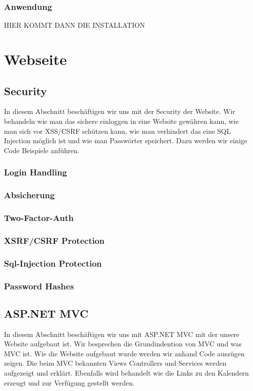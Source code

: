 \documentclass[12pt]{scrartcl}
\begin{document}
\subsubsection {Anwendung}
HIER KOMMT DANN DIE INSTALLATION

\section{Webseite}
\label{sec:Webseite}
\subsection{Security}
\label{sec:Security}
In diesem Abschnitt beschäftigen wir uns mit der Security der Website.
Wir behandeln wie man das sichere einloggen in eine Website gewähren kann, 
wie man sich vor XSS/CSRF schützen kann, wie man verhindert das eine SQL Injection
möglich ist und wie man Passwörter speichert. Dazu werden wir einige Code Beispiele anführen.

\subsubsection{Login Handling}
\label{sec:Login}
\subsubsection{Absicherung}
\label{sec:Absicherung}
\subsubsection{Two-Factor-Auth}
\label{sec:tfa}
\subsubsection{XSRF/CSRF Protection}
\label{sec:xss}
\subsubsection{Sql-Injection Protection}
\label{sec:sqli}
\subsubsection{Password Hashes}
\label{sec:hash}
\subsection{ASP.NET MVC}
In diesem Abschnitt beschäftigen wir uns mit ASP.NET MVC mit der unsere Website aufgebaut ist. Wir besprechen die Grundindention von MVC und was MVC ist. Wie die Website aufgebaut wurde werden wir anhand Code auszügen zeigen. Die beim MVC bekannten Views Controllers und Services werden aufgezeigt und erklärt. Ebenfalls wird behandelt wie die Links zu den Kalendern erzeugt und zur Verfügung gestellt werden. 
\label{sec:MVC}
\end{document}
